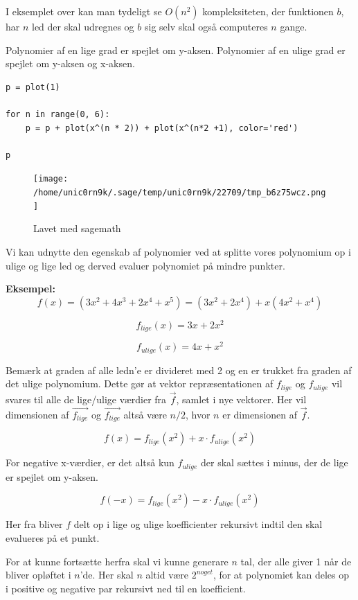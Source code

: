 \documentclass[11pt,a4paper]{article}
\begin{document}
I eksemplet over kan man tydeligt se \(O(n^2)\) kompleksiteten,
der funktionen \(b\), har \(n\) led der skal udregnes
og \(b\) sig selv skal også computeres \(n\) gange.

\newpage

Polynomier af en lige grad er spejlet om y-aksen.
Polynomier af en ulige grad er spejlet om y-aksen og x-aksen.

\begin{verbatim}
p = plot(1)

for n in range(0, 6):
    p = p + plot(x^(n * 2)) + plot(x^(n*2 +1), color='red')

p
\end{verbatim}

\begin{figure}[htbp]
\centering
\texttt{[image: /home/unic0rn9k/.sage/temp/unic0rn9k/22709/tmp\_b6z75wcz.png]}
\caption{Lavet med sagemath}
\end{figure}

Vi kan udnytte den egenskab af polynomier ved at splitte vores polynomium op i ulige og lige led
og derved evaluer polynomiet på mindre punkter.

\textbf{Eksempel:}
$$
f(x) = (3x^2 + 4x^3 + 2x^4 + x^5) = (3x^2 + 2x^4) + x(4x^2 + x^4)
$$

$$
f_{lige}(x) = 3x + 2x^2
$$

$$
f_{ulige}(x) = 4x + x^2
$$

Bemærk at graden af alle ledn'e er divideret med 2 og en er trukket fra graden af det ulige polynomium.
Dette gør at vektor repræsentationen af \(f_{lige}\) og \(f_{ulige}\) vil svares til alle de lige/ulige værdier fra \(\vec{f}\),
samlet i nye vektorer. Her vil dimensionen af \({\vec{f_{lige}}}\) og \({\vec{f_{lige}}}\) altså være \(n/2\), hvor \(n\) er dimensionen af \(\vec{f}\).

$$
f(x) = f_{lige}(x^2) + x \cdot f_{ulige}(x^2)
$$

For negative x-værdier, er det altså kun \(f_{ulige}\) der skal sættes i minus,
der de lige er spejlet om y-aksen.

$$
f(-x) = f_{lige}(x^2) - x \cdot f_{ulige}(x^2)
$$

Her fra bliver \(f\) delt op i lige og ulige koefficienter rekursivt indtil den skal evalueres på et punkt.

For at kunne fortsætte herfra skal vi kunne generare \(n\) tal, der alle giver 1 når de bliver opløftet i \(n\)'de.
Her skal \(n\) altid være \(2^{noget}\), for at polynomiet kan deles op i positive og negative par rekursivt ned til en koefficient.
\end{document}

